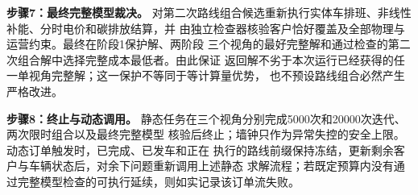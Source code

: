 

\textbf{步骤7：最终完整模型裁决。}
对第二次路线组合候选重新执行实体车排班、非线性补能、分时电价和碳排放结算，并
由独立检查器核验客户恰好覆盖及全部物理与运营约束。最终在阶段1保护解、两阶段
三个视角的最好完整解和通过检查的第二次组合解中选择完整成本最低者。由此保证
返回解不劣于本次运行已经获得的任一单视角完整解；这一保护不等同于等计算量优势，
也不预设路线组合必然产生严格改进。

\textbf{步骤8：终止与动态调用。}
静态任务在三个视角分别完成5000次和20000次迭代、两次限时组合以及最终完整模型
核验后终止；墙钟只作为异常失控的安全上限。动态订单触发时，已完成、已发车和正在
执行的路线前缀保持冻结，更新剩余客户与车辆状态后，对余下问题重新调用上述静态
求解流程；若既定预算内没有通过完整模型检查的可执行延续，则如实记录该订单流失败。
